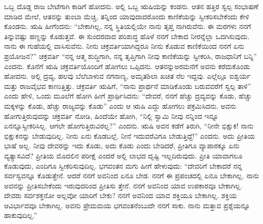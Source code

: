 ಒಬ್ಬ ದೊಡ್ಡ ರಾಜ ಬೇಟೆಗಾಗಿ ಕಾಡಿಗೆ ಹೋದನು. ಅಲ್ಲಿ ಒಬ್ಬ ಋಷಿಯನ್ನು ಕಂಡನು. ಆತನ ಹತ್ತಿರ ಸ್ವಲ್ಪ ಸಂಭಾಷಣೆ ಮಾಡಿದ ಮೇಲೆ, ಆತನನ್ನು ತುಂಬಾ ಮೆಚ್ಚಿ, ತನ್ನಿಂದ ಯಾವುದಾದರೊಂದು ಕಾಣಿಕೆಯನ್ನು ಸ್ವೀಕರಿಸಬೇಕೆಂದು ಕೇಳಿ ಕೊಂಡನು. ಋಷಿ ಹೀಗೆಂದನು: “ಬೇಕಾಗಿಲ್ಲ, ನನ್ನ ಸ್ಥಿತಿಯಲ್ಲಿಯೇ ನಾನು ತೃಪ್ತ ನಾಗಿರುವೆನು. ಈ ಮರಗಳು ನನಗೆ ತಿನ್ನುವಷ್ಟು ಹಣ್ಣನ್ನು ಕೊಡುತ್ತವೆ. ಈ ಸುಂದರವಾದ ಪರಿಶುದ್ಧ ಹೊಳೆ ನನಗೆ ಬೇಕಾದ ನೀರನ್ನೆಲ್ಲಾ ಒದಗಿಸುವುದು. ನಾನು ಈ ಗುಹೆಯಲ್ಲಿ ವಾಸಿಸುವೆನು. ನೀನು ಚಕ್ರವರ್ತಿಯಾಗಿದ್ದರೂ ನೀನು ಕೊಡುವ ಕಾಣಿಕೆಯಿಂದ ನನಗೆ ಏನು ಪ್ರಯೋಜನ?” ಚಕ್ರವರ್ತಿ “ನನ್ನ ಆತ್ಮ ಶುದ್ಧಿಗಾಗಿ, ನನ್ನ ತೃಪ್ತಿಗಾಗಿ ನೀವು ಕಾಣಿಕೆಯನ್ನು ಸ್ವೀಕರಿಸಿ, ರಾಜಧಾನಿಗೆ ಬನ್ನಿ” ಎಂದನು. ಕೊನೆಗೆ ಋಷಿ ಚಕ್ರವರ್ತಿಯೊಂದಿಗೆ ಹೋಗಲು ಒಪ್ಪಿದನು. ಆತನನ್ನು\break ಅರಮನೆಗೆ ಅವನು ಕರೆದುಕೊಂಡು ಹೋದನು. ಅಲ್ಲಿ ದ್ರವ್ಯ, ಹಲವು ಬೆಲೆಬಾಳುವ ನಗನಾಣ್ಯ, ಅಮೃತಶಿಲಾ ಖಚಿತ ನೆಲ ಇದ್ದವು. ಎಲ್ಲೆಲ್ಲೂ ಐಶ್ವರ್ಯ ಮತ್ತು ರಾಜವೈಭವ ಕಾಣುತ್ತಿತ್ತು. ಚಕ್ರವರ್ತಿ ಋಷಿಗೆ, “ನಾನು ಪ್ರಾರ್ಥನೆ ಮಾಡಿಕೊಂಡು ಬರುವವರೆಗೆ ಸ್ವಲ್ಪ ತಾಳಿ” ಎಂದು ಹೇಳಿ, ಒಂದು ಮೂಲೆಗೆ ಹೋಗಿ ಹೀಗೆ ಪ್ರಾರ್ಥಿಸಿದನು: “ದೇವರೆ, ನನಗೆ ಹೆಚ್ಚು ದ್ರವ್ಯವನ್ನು ಕೊಡು, ಹೆಚ್ಚು ಮಕ್ಕಳನ್ನು ಕೊಡು, ಹೆಚ್ಚು ರಾಜ್ಯವನ್ನು ಕೊಡು” ಎಂದು ಆ ಋಷಿ ಎದ್ದು ಹೋಗಲು ಪಕ್ರಮಿಸಿದನು. ಅವನು ಹೋಗುತ್ತಿರುವುದನ್ನು ಚಕ್ರವರ್ತಿ ನೋಡಿ, ಹಿಂದೆಯೇ ಹೋಗಿ, “ನಿಲ್ಲಿ ಸ್ವಾಮಿ ನೀವು ನನ್ನಿಂದ ಇನ್ನೂ ಏನನ್ನೂ\break ಸ್ವೀಕರಿಸಿಲ್ಲ. ಆಗಲೇ ಹೋಗುತ್ತಿರುವಿರಲ್ಲ?” ಎಂದನು. ಋಷಿ ಅವನ ಕಡೆಗೆ ತಿರುಗಿ, “ನೀನೇ ಭಿಕ್ಷುಕ! ನಾನು ಭಿಕ್ಷುಕನನ್ನು ಬೇಡುವುದಿಲ್ಲ. ನೀನು ಏನು ಕೊಡಬಲ್ಲೆ, ನೀನೆ ಇದುವರೆವಿಗೂ ಬೇಡುತ್ತಿದ್ದೆ!” ಎಂದನು. ಅದು ಪ್ರೀತಿಯ ಭಾಷೆ ಅಲ್ಲ. ನೀವು ದೇವರನ್ನು ಇದು ಕೊಡು, ಅದು ಕೊಡು ಎಂದು ಬೇಡಿದರೆ, ಪ್ರೀತಿಗೂ ವ್ಯಾಪಾರಕ್ಕೂ ಏನು ವ್ಯತ್ಯಾಸವಿದೆ? ಪ್ರೀತಿಯ ಮೊದಲಿನ ಪರೀಕ್ಷೆ ಎಂದರೆ ಅಲ್ಲಿ ಲಾಭದ ದೃಷ್ಟಿ ಇಲ್ಲದಿರುವುದು. ಪ್ರೀತಿ ಯಾವಾಗಲೂ ಕೊಡುವುದು, ಎಂದಿಗೂ ಸ್ವೀಕರಿಸುವುದಿಲ್ಲ. ಭಗವಂತನ ಮಗು ಹೀಗೆ ಹೇಳುವುದು: “ದೇವರಿಗೆ ಬೇಕಾದರೆ ನನ್ನ ಸರ್ವಸ್ವವನ್ನೂ ಕೊಡುತ್ತೇನೆ. ಆದರೆ ನನಗೆ ಅವನಿಂದ ಏನೂ ಬೇಡ. ನನಗೆ ಈ ಪ್ರಪಂಚದಲ್ಲಿ ಏನೂ ಬೇಕಾಗಿಲ್ಲ. ನಾನು ಅವನನ್ನು ಪ್ರೀತಿಸಬೇಕೆಂದು ಇರುವುದರಿಂದ ಪ್ರೀತಿಸು ತ್ತೇನೆ. ನನಗೆ ಅವನಿಂದ ಯಾವ ಉಪಕಾರವೂ ಬೇಕಾಗಿಲ್ಲ. ದೇವರು ಸರ್ವಶಕ್ತನೋ ಅಲ್ಲವೋ ಯಾರಿಗೆ ಬೇಕು? ನನಗೆ ಅವನಿಂದ ಯಾವ ಶಕ್ತಿಯೂ ಬೇಕಾಗಿಲ್ಲ. ಶಕ್ತಿಯ ಆವಿರ್ಭಾವವೂ ಬೇಕಾಗಿಲ್ಲ. ಅವನು ಪ್ರೇಮಮಯ ಭಗವಂತನೆಂಬುದೇ ನನಗೆ ಸಾಕು. ನಾನು ಮತ್ತಾವ ಪ್ರಶ್ನೆಯನ್ನೂ ಹಾಕುವುದಿಲ್ಲ.”


